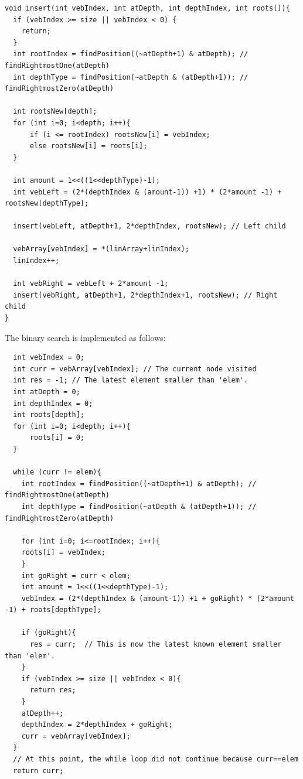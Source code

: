 \begin{verbatim}
void insert(int vebIndex, int atDepth, int depthIndex, int roots[]){
  if (vebIndex >= size || vebIndex < 0) {
    return;
  }
  int rootIndex = findPosition((~atDepth+1) & atDepth); // findRightmostOne(atDepth)
  int depthType = findPosition(~atDepth & (atDepth+1)); // findRightmostZero(atDepth)
    
  int rootsNew[depth];
  for (int i=0; i<depth; i++){
      if (i <= rootIndex) rootsNew[i] = vebIndex;
      else rootsNew[i] = roots[i];
  }

  int amount = 1<<((1<<depthType)-1);
  int vebLeft = (2*(depthIndex & (amount-1)) +1) * (2*amount -1) + rootsNew[depthType];

  insert(vebLeft, atDepth+1, 2*depthIndex, rootsNew); // Left child
    
  vebArray[vebIndex] = *(linArray+linIndex);
  linIndex++;

  int vebRight = vebLeft + 2*amount -1;
  insert(vebRight, atDepth+1, 2*depthIndex+1, rootsNew); // Right child
}
\end{verbatim}


The binary search is implemented as follows:
\begin{verbatim}
  int vebIndex = 0;
  int curr = vebArray[vebIndex]; // The current node visited
  int res = -1; // The latest element smaller than 'elem'.
  int atDepth = 0;
  int depthIndex = 0;
  int roots[depth];
  for (int i=0; i<depth; i++){
      roots[i] = 0;
  }
    
  while (curr != elem){
    int rootIndex = findPosition((~atDepth+1) & atDepth); // findRightmostOne(atDepth)
    int depthType = findPosition(~atDepth & (atDepth+1)); // findRightmostZero(atDepth)

    for (int i=0; i<=rootIndex; i++){
	roots[i] = vebIndex;
    }
    int goRight = curr < elem;
    int amount = 1<<((1<<depthType)-1);
    vebIndex = (2*(depthIndex & (amount-1)) +1 + goRight) * (2*amount -1) + roots[depthType];

    if (goRight){
      res = curr;  // This is now the latest known element smaller than 'elem'.
    }
    if (vebIndex >= size || vebIndex < 0){
      return res;
    }
    atDepth++;
    depthIndex = 2*depthIndex + goRight;
    curr = vebArray[vebIndex];
  }
  // At this point, the while loop did not continue because curr==elem
  return curr;
\end{verbatim}








